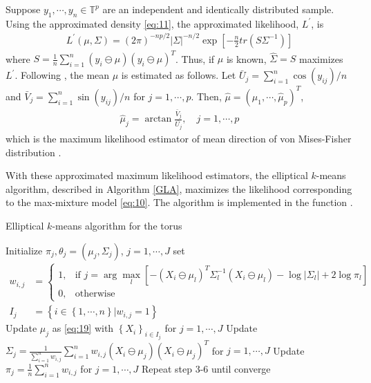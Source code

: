 Suppose $y_1,\cdots,y_n\in\mathbb{T}^p$ are an independent and identically distributed sample. Using the approximated density \eqref{eq:11}, the approximated likelihood, $L^\prime$, is
\begin{align}
L^\prime\left(\mu, \Sigma\right) = \left(2\pi\right)^{-np/2}\left|\Sigma\right|^{-n/2}\exp\left[-\frac{n}{2}tr\left( S\Sigma^{-1}\right)\right]
\end{align}
where $S=\frac{1}{n}\sum_{i=1}^n \left(y_i\ominus\mu\right)\left(y_i\ominus\mu\right)^T$. Thus, if $\mu$ is known, $\hat{\Sigma} = S$ maximizes $L^\prime$. Following \citet{Mardia:2012}, the mean $\mu$ is estimated as follows. Let $\bar{U}_j = \sum_{i=1}^n \cos\left(y_{ij}\right)/n$ and $\bar{V}_j = \sum_{i=1}^n \sin\left(y_{ij}\right)/n$ for $j=1,\cdots,p$. Then, $\hat{\mu} = \left(\hat{\mu}_1,\cdots,\hat{\mu}_p\right)^T$,
\begin{align}\label{eq:19}
\hat{\mu}_j = \arctan{\frac{\bar{V}_j}{\bar{U_j}}},\quad j=1,\cdots,p
\end{align}
which is the maximum likelihood estimator of mean direction of von Mises-Fisher distribution \citep{Mardia}.

With these approximated maximum likelihood estimators, the elliptical $k$-means algorithm, described in Algorithm \ref{GLA}, maximizes the likelihood corresponding to the max-mixture model \eqref{eq:10}. The algorithm is implemented in the function . 

\begin{algorithm}[hbt!]
\caption{Elliptical $k$-means algorithm for the torus}\label{GLA}
\begin{algorithmic}[1]
  \State Initialize $\pi_j, \theta_j = \left(\mu_j,\Sigma_j\right)$, $j=1,\cdots,J$
  \State set \begin{align*}    w_{i,j}&=
\begin{cases}
1, & \mbox{if }j=\arg\max_l\left[-\left(X_i\ominus \mu_l\right)^T\Sigma_l^{-1}\left(X_i\ominus \mu_l\right)-\log\left|\Sigma_l\right|+2\log\pi_l\right] \\
0, & \mbox{otherwise}
\end{cases}\\I_j &= \left\{i\in\left\{1,\cdots,n\right\}|w_{i,j}=1\right\}\end{align*}
  \State Update $\mu_j$ as \eqref{eq:19} with $\left\{X_i\right\}_{i\in I_j}$ for $j=1,\cdots, J$
  \State Update $\Sigma_j=\frac{1}{\sum_{i=1}^nw_{i,j}}\sum_{i=1}^nw_{i,j}\left(X_i\ominus \mu_j\right)\left(X_i\ominus \mu_j\right)^T$ for $j=1,\cdots, J$
  \State Update $\pi_j = \frac{1}{n}\sum_{i=1}^nw_{i,j}$ for $j=1,\cdots, J$
  \State Repeat step 3-6 until converge
\EndProcedure
\end{algorithmic}
\end{algorithm}

